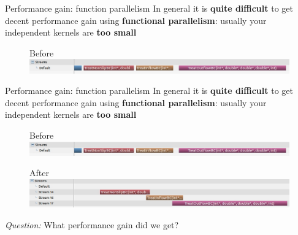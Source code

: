 \documentclass[9pt]{beamer}
\begin{document}
\begin{frame}[t]{Performance gain: function parallelism}
In general it is \textbf{quite difficult} to get decent performance gain using \textbf{functional parallelism}: usually your independent kernels are \textbf{too small}
\begin{figure}
	Before\\
	\includegraphics[scale=0.25]{images/streams-1.jpg}
	\centering
\end{figure}
\end{frame}

\begin{frame}[t]{Performance gain: function parallelism}
In general it is \textbf{quite difficult} to get decent performance gain using \textbf{functional parallelism}: usually your independent kernels are \textbf{too small}
\begin{figure}
	Before\\
	\includegraphics[scale=0.25]{images/streams-1.jpg}
	\centering
\end{figure}

\begin{figure}
	After\\
	\includegraphics[scale=0.25]{images/streams-2.jpg}
	\centering
\end{figure}

\textit{Question:} What performance gain did we get?\\
\end{frame}
\end{document}
